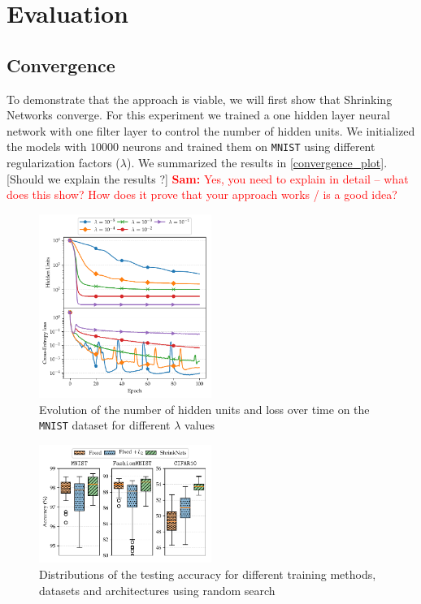 \documentclass[sigconf]{acmart}
\newcommand{\srm}[1]{\textcolor{red}{{\bf Sam:} #1}}
\begin{document}
\section{Evaluation}
\subsection{Convergence}

To demonstrate that the approach is viable, we will first show that Shrinking
Networks converge. For this experiment we trained a one hidden layer neural
network with one filter layer to control the number of hidden units. We
initialized the models with $10000$ neurons and trained them on \texttt{MNIST}
using different regularization factors ($\lambda$). We summarized the results in
\autoref{convergence_plot}. [Should we explain the results ?] \srm{Yes, you need
to explain in detail -- what does this show?  How does it prove that your
approach works / is a good idea?}

\begin{figure}
\begin{center}
\includegraphics[width=0.5\textwidth]{convergence}
\caption{Evolution of the number of hidden units and loss over time on the \texttt{MNIST} dataset for different $\lambda$ values \label{convergence_plot}}
\end{center}
\end{figure}

\begin{figure}
\begin{center}
  \includegraphics[width=0.5\textwidth]{hyper_opt}
\caption{Distributions of the testing accuracy for different training methods, datasets and architectures using random search\label{hyper_opt_res}}
\end{center}
\end{figure}
\end{document}

